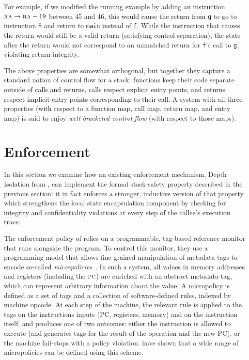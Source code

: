 \documentclass[acmsmall,review,anonymous]{acmart}\settopmatter{printfolios=true,printccs=false,printacmref=false}
\begin{document}
{For example, if we modified the running example by adding
an instruction $ \textsc{ra} \rightarrow \textsc{ra} - 19$
between 45 and 46, this would cause the return from {\tt g} to go to instruction 8 and
return to {\tt main} instead of {\tt f}. While the instruction that
causes the return would still be a valid return (satisfying control
separation), the state after the return would not correspond to an
unmatched return for {\tt f}'s call to {\tt g}, violating return
integrity.

The above properties are somewhat orthogonal, but together they
capture a standard notion of control flow for a stack: functions keep
their code separate outside of calls and returns, calls respect
explicit entry points, and returns respect implicit entry points
corresponding to their call.  A system with all three
properties (with respect to a function map, call map, return map,
and entry map) is said to enjoy
{\em well-bracketed control flow} (with respect to those maps).


\section{Enforcement}
\label{sec:enforcement}

In this section we examine how an existing enforcement mechanism,
Depth Isolation from \citet{DBLP:conf/sp/RoesslerD18}, can implement
the formal stack-safety property described in the previous section: it in
fact enforces a stronger, inductive version of that property which strengthens the
local state encapsulation component by checking for integrity and
confidentiality violations at every step of the callee's execution trace.

%
The enforcement policy of \citeauthor{DBLP:conf/sp/RoesslerD18} relies
on a programmable, tag-based reference monitor that runs alongside the
program.  To control this monitor, they use a programming model that
allows fine-grained manipulation of metadata tags to encode so-called
\emph{micropolicies}~\citep{pump_oakland2015}.
In such a system, all values in
memory addresses and registers (including the $\textsc{pc}$)
are enriched with an abstract metadata tag, which can represent
arbitrary information about the value. A micropolicy is defined as a set of tags and a
collection of software-defined rules, indexed by machine opcode.
At each step of the machine, the relevant rule is applied to the tags on
the instructions inputs (PC, registers, memory) and on the instruction itself, and produces
one of two outcomes: either the instruction is allowed to execute (and generates
tags for the result of the operation and the new PC), or the machine
fail-stops with a policy violation.
\citeauthor{pump_oakland2015} have shown that a wide range of micropolicies can
be defined using this scheme.

}
\end{document}
